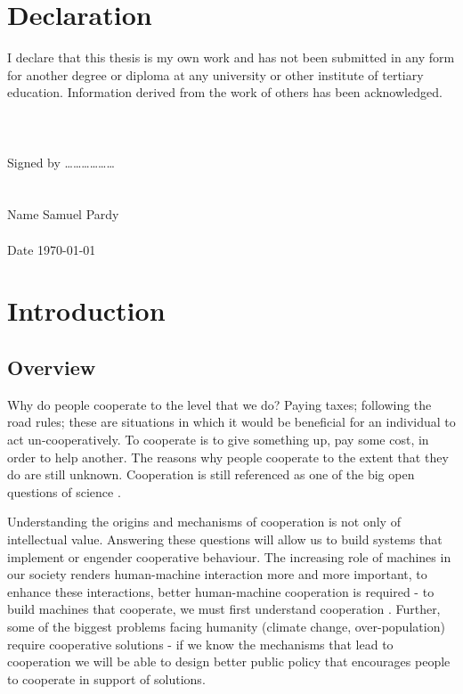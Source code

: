 \documentclass[11pt]{book}
\newcommand*{\np}{\par\noindent\newline}
\begin{document}
\chapter*{Declaration}
\np I declare that this thesis is my own work and has not been submitted in any form for another degree or diploma at any university or other institute of tertiary education. Information derived from the work of others has been acknowledged.\\\\\\\\



\noindent Signed by ………………\\\\\\




\noindent Name \quad	Samuel Pardy\\\\
\noindent Date \quad \today


\tableofcontents
\newpage
\listoffigures
\chapter{Introduction}
\section{Overview}\label{overview}
Why do people cooperate to the level that we do? Paying taxes; following the road rules; these are situations in which it would be beneficial for an individual to act un-cooperatively.
To cooperate is to give something up, pay some cost, in order to help another.
The reasons why people cooperate to the extent that they do are still unknown. 
Cooperation is still referenced as one of the big open questions of science \citep{pennisi_how_2005}.

\np Understanding the origins and mechanisms of cooperation is not only of intellectual value.
Answering these questions will allow us to build systems that implement or engender cooperative behaviour. 
The increasing role of machines in our society renders human-machine interaction more and more important, to enhance these interactions, better human-machine cooperation is required -
 to build machines that cooperate, we must first understand cooperation \citep{hoc_human_2000}.
Further, some of the biggest problems facing humanity (climate change, over-population) require cooperative solutions - 
if we know the mechanisms that lead to cooperation we will be able to design better public policy that encourages people to cooperate in support of solutions.
\end{document}
